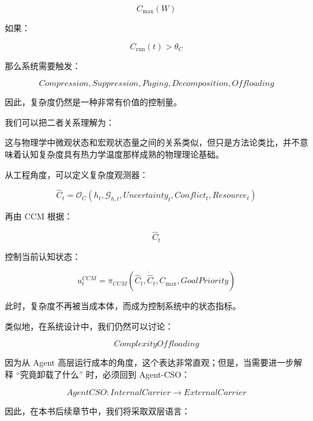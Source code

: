 \[
C_{\max}(W)
\]

如果：

\[
C_{\mathrm{run}}(t)
>
\theta_C
\]

那么系统需要触发：

\[
Compression,
Suppression,
Paging,
Decomposition,
Offloading
\]

因此，复杂度仍然是一种非常有价值的控制量。

我们可以把二者关系理解为：

\begin{statementbox}
\centering
{}
\end{statementbox}

\begin{statementbox}
\centering
{}
\end{statementbox}

这与物理学中微观状态和宏观状态量之间的关系类似，但只是方法论类比，并不意味着认知复杂度具有热力学温度那样成熟的物理理论基础。

从工程角度，可以定义复杂度观测器：

\[
\hat C_t
=
\mathcal O_C(
h_t,
\mathcal G_{h,t},
Uncertainty_t,
Conflict_t,
Resource_t
)
\]

再由 CCM 根据：

\[
\hat C_t
\]

控制当前认知状态：

\[
u_t^{CCM}
=
\pi_{CCM}(
\hat C_t,
\dot{\hat C}_t,
C_{\max},
GoalPriority
)
\]

此时，复杂度不再被当成本体，而成为控制系统中的状态指标。

类似地，在系统设计中，我们仍然可以讨论：

\[
ComplexityOffloading
\]

因为从 Agent 高层运行成本的角度，这个表达非常直观；但是，当需要进一步解释 ``究竟卸载了什么'' 时，必须回到 Agent-CSO：

\[
AgentCSO:
InternalCarrier
\rightarrow
ExternalCarrier
\]

因此，在本书后续章节中，我们将采取双层语言：

\begin{statementbox}
\centering
{}
\end{statementbox}

\begin{statementbox}
\centering
{}
\end{statementbox}

